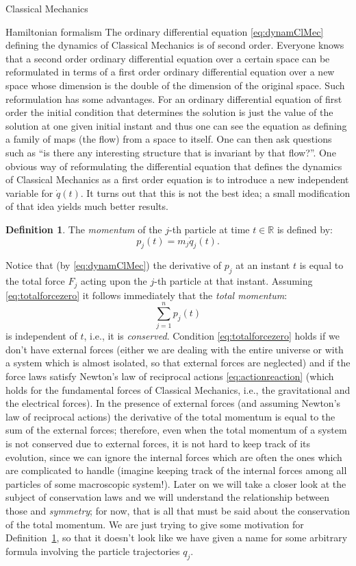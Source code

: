 \documentclass[oneside,a4paper,11pt]{amsbook}
\newcommand{\R}{\mathds R}
\theoremstyle{remark}\newtheorem{exercise}{Exercise}[chapter]
\theoremstyle{plain}\newtheorem{teo}{Theorem}[section]
\theoremstyle{plain}\newtheorem{lem}[teo]{Lemma}
\theoremstyle{plain}\newtheorem{prop}[teo]{Proposition}
\theoremstyle{plain}\newtheorem{cor}[teo]{Corollary}
\theoremstyle{definition}\newtheorem{defin}[teo]{Definition}
\theoremstyle{remark}\newtheorem{rem}[teo]{Remark}
\theoremstyle{definition}\newtheorem{notation}[teo]{Notation}
\theoremstyle{definition}\newtheorem{convention}[teo]{Convention}
\theoremstyle{definition}\newtheorem{example}[teo]{Example}
\numberwithin{section}{chapter}
\numberwithin{equation}{section}
\begin{document}
\begin{chapter}{Classical Mechanics}
\begin{section}{Hamiltonian formalism}
The ordinary differential equation \eqref{eq:dynamClMec} defining the dynamics of Classical Mechanics is of second order. Everyone knows
that a second order ordinary differential equation over a certain space can be reformulated in terms of a first order
ordinary differential equation over a new space whose dimension is the double of the dimension of the original space.
Such reformulation has some advantages. For an ordinary differential equation of first order the initial condition
that determines the solution is just the value of the solution at one given initial instant and thus one can see
the equation as defining a family of maps (the flow) from a space to itself.
One can then ask questions such as ``is there any interesting structure that is invariant by that flow?''. One
obvious way of reformulating the differential equation that defines the dynamics of Classical Mechanics as a first order
equation is to introduce a new independent variable for $\dot q(t)$. It turns out that this is not
the best idea; a small modification of that idea yields much better results.

\begin{defin}\label{thm:defmomentum}
The {\em momentum\/} of the $j$-th particle at time $t\in\R$ is defined by:
\begin{equation}\label{eq:defmomentum}
p_j(t)=m_j\dot q_j(t).
\end{equation}
\end{defin}
Notice that (by \eqref{eq:dynamClMec}) the derivative of $p_j$ at an instant $t$ is equal to the total force
$F_j$ acting upon the $j$-th particle at that instant. Assuming \eqref{eq:totalforcezero} it follows immediately that the
{\em total momentum}:
\[\sum_{j=1}^np_j(t)\]
is independent of $t$, i.e., it is {\em conserved}. Condition \eqref{eq:totalforcezero} holds if we don't have
external forces (either we are dealing with the entire universe or with a system which is almost isolated, so that
external forces are neglected) and if the force laws satisfy Newton's law of reciprocal actions \eqref{eq:actionreaction}
(which holds for the fundamental forces of Classical Mechanics, i.e., the gravitational and the electrical forces).
In the presence of external forces (and assuming Newton's law of reciprocal actions) the derivative
of the total momentum is equal to the sum of the external forces; therefore, even when the total momentum
of a system is not conserved due to external forces, it is not hard to keep track of its evolution, since we can
ignore the internal forces which are often the ones which are complicated to handle (imagine keeping track of the
internal forces among all particles of some macroscopic system!). Later on we will take a closer look at the subject of
conservation laws and we will understand the relationship between those and {\em symmetry};
for now, that is all that must be said about the conservation of the total momentum. We are just trying to give
some motivation for Definition~\ref{thm:defmomentum}, so that it doesn't look like we have given a name for some
arbitrary formula involving the particle trajectories $q_j$.


\end{section}
\end{chapter}
\end{document}
